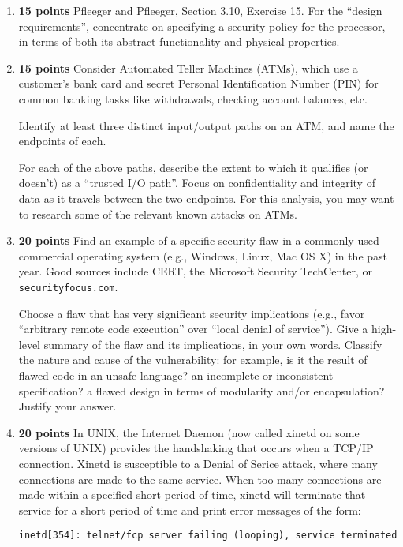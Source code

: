 \documentclass[11pt]{article}
\begin{document}
\begin{enumerate}
\item {\bf 15 points} Pfleeger and Pfleeger, Section 3.10, Exercise
  15. For the ``design requirements'', concentrate on specifying a
  security policy for the processor, in terms of both its abstract
  functionality and physical properties.

\item {\bf 15 points} Consider Automated Teller Machines (ATMs), which
  use a customer’s bank card and secret Personal Identiﬁcation Number
  (PIN) for common banking tasks like withdrawals, checking account
  balances, etc.

Identify at least three distinct input/output paths on an ATM, and name the
endpoints of each.

For each of the above paths, describe the extent to which it qualifies
(or doesn't) as a ``trusted I/O path''. Focus on conﬁdentiality and
integrity of data as it travels between the two endpoints. For this
analysis, you may want to research some of the relevant known attacks on
ATMs.

\item {\bf 20 points} Find an example of a speciﬁc security flaw in a
  commonly used commercial operating system (e.g., Windows, Linux, Mac
  OS X) in the past year. Good sources include CERT, the Microsoft
  Security TechCenter, or {\tt securityfocus.com}.

  Choose a flaw that has very signiﬁcant security implications (e.g.,
  favor “arbitrary remote code execution” over “local denial of
  service”).  Give a high-level summary of the flaw and its
  implications, in your own words.  Classify the nature and cause of
  the vulnerability: for example, is it the result of flawed code in an
  unsafe language? an incomplete or inconsistent speciﬁcation? a flawed
  design in terms of modularity and/or encapsulation? Justify your
  answer.

\item {\bf 20 points} In UNIX, the Internet Daemon (now called xinetd on
  some versions of UNIX) provides the handshaking that occurs when a
  TCP/IP connection.  Xinetd is susceptible to a Denial of Serice attack,
  where many connections are made to the same service.  When too many
  connections are made within a specified short period of time, xinetd
  will terminate that service for a short period of time and print error
  messages of the form:

\begin{verbatim}
inetd[354]: telnet/fcp server failing (looping), service terminated
\end{verbatim}


\end{enumerate}
\end{document}
